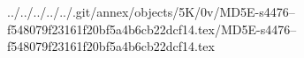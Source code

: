 ../../../../../.git/annex/objects/5K/0v/MD5E-s4476--f548079f23161f20bf5a4b6cb22dcf14.tex/MD5E-s4476--f548079f23161f20bf5a4b6cb22dcf14.tex